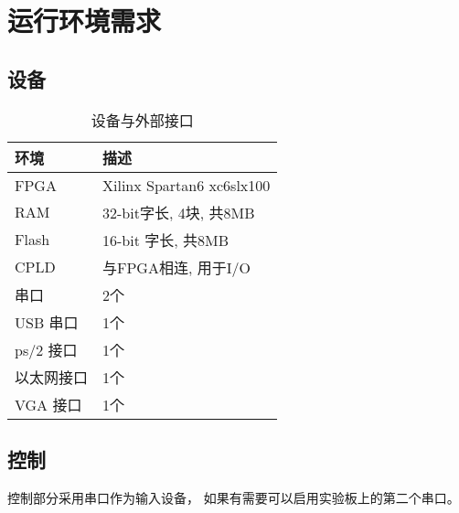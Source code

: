 \section{运行环境需求}
    \subsection{设备}

        \begin{table}[!hbp]
        \centering
        \caption{设备与外部接口}
        \begin{tabular}{|l|l|}
        \hline
        环境 & 描述 \\
        \hline
        FPGA & Xilinx Spartan6 xc6slx100 \\
        \hline
        RAM & 32-bit字长, 4块, 共8MB \\
        \hline
        Flash & 16-bit 字长, 共8MB \\
        \hline
        CPLD & 与FPGA相连, 用于I/O \\
        \hline
        串口 & 2个 \\
        \hline
        USB 串口 & 1个 \\
        \hline
        ps/2 接口 & 1个 \\
        \hline
        以太网接口 & 1个 \\
        \hline
        VGA 接口 & 1个 \\
        \hline
        \end{tabular}
        \end{table}

    \subsection{控制}
        控制部分采用串口作为输入设备，%
        如果有需要可以启用实验板上的第二个串口。%
